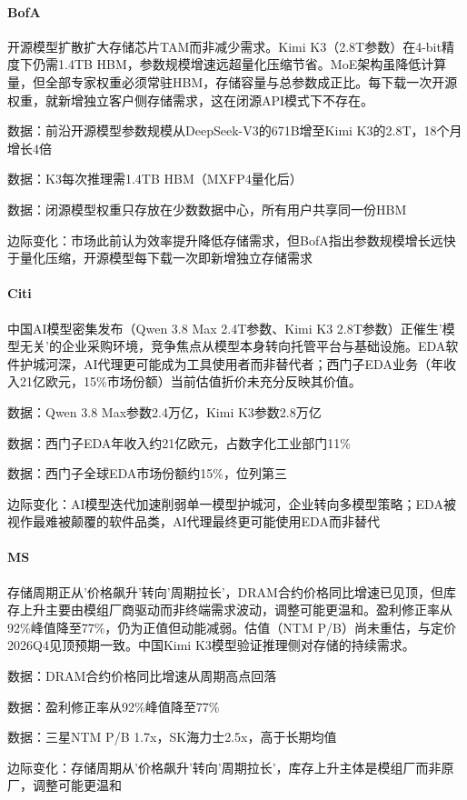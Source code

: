 \documentclass[11pt]{ctexart}
\begin{document}
\paragraph{BofA} 开源模型扩散扩大存储芯片TAM而非减少需求。Kimi K3（2.8T参数）在4-bit精度下仍需1.4TB HBM，参数规模增速远超量化压缩节省。MoE架构虽降低计算量，但全部专家权重必须常驻HBM，存储容量与总参数成正比。每下载一次开源权重，就新增独立客户侧存储需求，这在闭源API模式下不存在。
{\small\color{refgray}数据：前沿开源模型参数规模从DeepSeek-V3的671B增至Kimi K3的2.8T，18个月增长4倍\par}
{\small\color{refgray}数据：K3每次推理需1.4TB HBM（MXFP4量化后）\par}
{\small\color{refgray}数据：闭源模型权重只存放在少数数据中心，所有用户共享同一份HBM\par}
{\small\color{refgray}边际变化：市场此前认为效率提升降低存储需求，但BofA指出参数规模增长远快于量化压缩，开源模型每下载一次即新增独立存储需求\par}
\paragraph{Citi} 中国AI模型密集发布（Qwen 3.8 Max 2.4T参数、Kimi K3 2.8T参数）正催生'模型无关'的企业采购环境，竞争焦点从模型本身转向托管平台与基础设施。EDA软件护城河深，AI代理更可能成为工具使用者而非替代者；西门子EDA业务（年收入21亿欧元，15\%市场份额）当前估值折价未充分反映其价值。
{\small\color{refgray}数据：Qwen 3.8 Max参数2.4万亿，Kimi K3参数2.8万亿\par}
{\small\color{refgray}数据：西门子EDA年收入约21亿欧元，占数字化工业部门11\%\par}
{\small\color{refgray}数据：西门子全球EDA市场份额约15\%，位列第三\par}
{\small\color{refgray}边际变化：AI模型迭代加速削弱单一模型护城河，企业转向多模型策略；EDA被视作最难被颠覆的软件品类，AI代理最终更可能使用EDA而非替代\par}
\paragraph{MS} 存储周期正从'价格飙升'转向'周期拉长'，DRAM合约价格同比增速已见顶，但库存上升主要由模组厂商驱动而非终端需求波动，调整可能更温和。盈利修正率从92\%峰值降至77\%，仍为正值但动能减弱。估值（NTM P/B）尚未重估，与定价2026Q4见顶预期一致。中国Kimi K3模型验证推理侧对存储的持续需求。
{\small\color{refgray}数据：DRAM合约价格同比增速从周期高点回落\par}
{\small\color{refgray}数据：盈利修正率从92\%峰值降至77\%\par}
{\small\color{refgray}数据：三星NTM P/B 1.7x，SK海力士2.5x，高于长期均值\par}
{\small\color{refgray}边际变化：存储周期从'价格飙升'转向'周期拉长'，库存上升主体是模组厂而非原厂，调整可能更温和\par}
\end{document}

